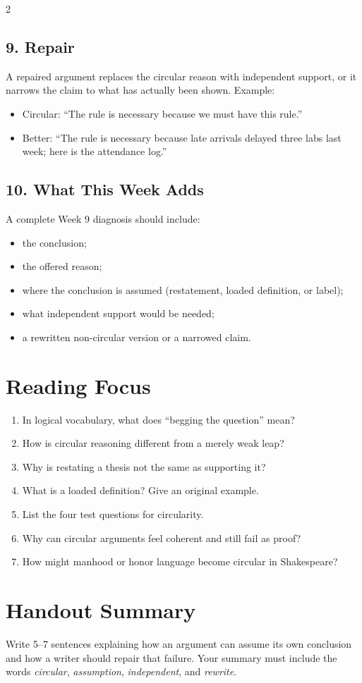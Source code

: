 \documentclass[12pt]{article}
\begin{document}
\begin{multicols}{2}
\subsection*{9. Repair}
A repaired argument replaces the circular reason with independent support, or it narrows the claim to what has actually been shown. Example:
\begin{itemize}[leftmargin=*]
\item Circular: ``The rule is necessary because we must have this rule.''
\item Better: ``The rule is necessary because late arrivals delayed three labs last week; here is the attendance log.''
\end{itemize}

\subsection*{10. What This Week Adds}
A complete Week 9 diagnosis should include:
\begin{itemize}[leftmargin=*,itemsep=0.12em]
\item the conclusion;
\item the offered reason;
\item where the conclusion is assumed (restatement, loaded definition, or label);
\item what independent support would be needed;
\item a rewritten non-circular version or a narrowed claim.
\end{itemize}

\section*{Reading Focus}
\begin{enumerate}[leftmargin=*]
\item In logical vocabulary, what does ``begging the question'' mean?
\item How is circular reasoning different from a merely weak leap?
\item Why is restating a thesis not the same as supporting it?
\item What is a loaded definition? Give an original example.
\item List the four test questions for circularity.
\item Why can circular arguments feel coherent and still fail as proof?
\item How might manhood or honor language become circular in Shakespeare?
\end{enumerate}

\section*{Handout Summary}
Write 5--7 sentences explaining how an argument can assume its own conclusion and how a writer should repair that failure. Your summary must include the words \textit{circular}, \textit{assumption}, \textit{independent}, and \textit{rewrite}.
\end{multicols}
\end{document}
